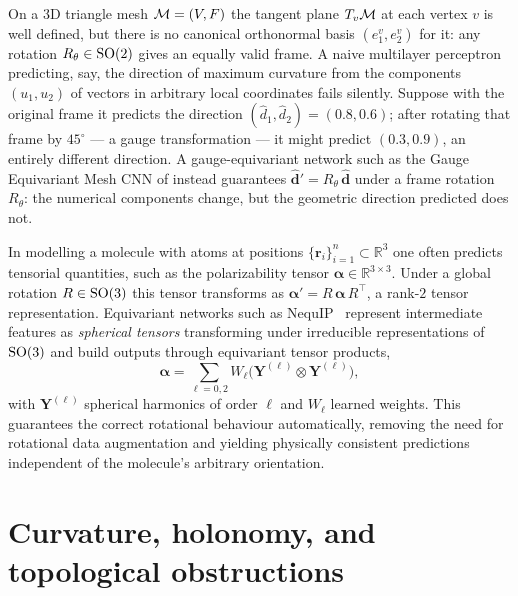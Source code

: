 \begin{example}
\label{ex:gauge:mesh}
On a $3$D triangle mesh $\mathcal{M} = (V, F)$ the tangent plane $T_v\mathcal{M}$ at each
vertex $v$ is well defined, but there is no canonical orthonormal basis
$(e_1^v, e_2^v)$ for it: any rotation $R_\theta \in \operatorname{SO}(2)$ gives an equally
valid frame. A naive multilayer perceptron predicting, say, the direction of
maximum curvature from the components $(u_1, u_2)$ of vectors in arbitrary local
coordinates fails silently. Suppose with the original frame it predicts the
direction $(\hat d_1, \hat d_2) = (0.8, 0.6)$; after rotating that frame by
$45^\circ$ --- a gauge transformation --- it might predict $(0.3, 0.9)$, an
entirely different direction. A gauge-equivariant network such as the Gauge
Equivariant Mesh CNN of \citet{cohen2019gaugeequivariantconvolutional} instead
guarantees $\hat{\mathbf{d}}' = R_\theta\,\hat{\mathbf{d}}$ under a frame rotation
$R_\theta$: the numerical components change, but the geometric direction
predicted does not.
\end{example}

\begin{example}
\label{ex:gauge:molecules}
In modelling a molecule with atoms at positions $\{\mathbf{r}_i\}_{i=1}^n \subset
\mathbb{R}^3$ one often predicts tensorial quantities, such as the polarizability
tensor $\boldsymbol{\alpha} \in \mathbb{R}^{3\times 3}$. Under a global rotation
$R \in \operatorname{SO}(3)$ this tensor transforms as $\boldsymbol{\alpha}' = R\,
\boldsymbol{\alpha}\, R^{\!\top}$, a rank-$2$ tensor representation. Equivariant
networks such as NequIP~\citep{batzner2022nequip} represent intermediate features
as \emph{spherical tensors} transforming under irreducible representations of
$\operatorname{SO}(3)$ and build outputs through equivariant tensor products,
\[
  \boldsymbol{\alpha} = \sum_{\ell = 0, 2} W_\ell \big(\mathbf{Y}^{(\ell)} \otimes
  \mathbf{Y}^{(\ell)}\big),
\]
with $\mathbf{Y}^{(\ell)}$ spherical harmonics of order $\ell$ and $W_\ell$
learned weights. This guarantees the correct rotational behaviour automatically,
removing the need for rotational data augmentation and yielding physically
consistent predictions independent of the molecule's arbitrary orientation.
\end{example}

\section{Curvature, holonomy, and topological obstructions}
\label{sec:gauge:curvature}

